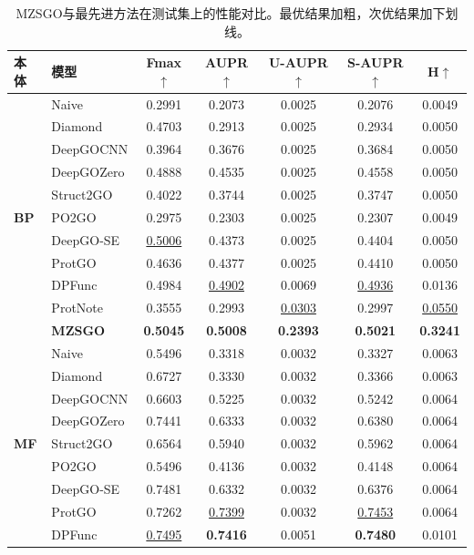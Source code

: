 \begin{table}[htbp]
\centering
\caption{MZSGO与最先进方法在测试集上的性能对比。最优结果加粗，次优结果加下划线。}
\label{tab:mzsgo_comparison}
\small
\begin{tabular}{llccccc}
\toprule
\textbf{本体} & \textbf{模型} & \textbf{Fmax}$\uparrow$ & \textbf{AUPR}$\uparrow$ & \textbf{U-AUPR}$\uparrow$ & \textbf{S-AUPR}$\uparrow$ & \textbf{H}$\uparrow$ \\
\midrule
\multirow{11}{*}{\textbf{BP}} 
 & Naive & 0.2991 & 0.2073 & 0.0025 & 0.2076 & 0.0049 \\
 & Diamond & 0.4703 & 0.2913 & 0.0025 & 0.2934 & 0.0050 \\
 & DeepGOCNN & 0.3964 & 0.3676 & 0.0025 & 0.3684 & 0.0050 \\
 & DeepGOZero & 0.4888 & 0.4535 & 0.0025 & 0.4558 & 0.0050 \\
 & Struct2GO & 0.4022 & 0.3744 & 0.0025 & 0.3747 & 0.0050 \\
 & PO2GO & 0.2975 & 0.2303 & 0.0025 & 0.2307 & 0.0049 \\
 & DeepGO-SE & \underline{0.5006} & 0.4373 & 0.0025 & 0.4404 & 0.0050 \\
 & ProtGO & 0.4636 & 0.4377 & 0.0025 & 0.4410 & 0.0050 \\
 & DPFunc & 0.4984 & \underline{0.4902} & 0.0069 & \underline{0.4936} & 0.0136 \\
 & ProtNote & 0.3555 & 0.2993 & \underline{0.0303} & 0.2997 & \underline{0.0550} \\
 & \textbf{MZSGO} & \textbf{0.5045} & \textbf{0.5008} & \textbf{0.2393} & \textbf{0.5021} & \textbf{0.3241} \\
\midrule
\multirow{11}{*}{\textbf{MF}} 
 & Naive & 0.5496 & 0.3318 & 0.0032 & 0.3327 & 0.0063 \\
 & Diamond & 0.6727 & 0.3330 & 0.0032 & 0.3366 & 0.0063 \\
 & DeepGOCNN & 0.6603 & 0.5225 & 0.0032 & 0.5242 & 0.0064 \\
 & DeepGOZero & 0.7441 & 0.6333 & 0.0032 & 0.6380 & 0.0064 \\
 & Struct2GO & 0.6564 & 0.5940 & 0.0032 & 0.5962 & 0.0064 \\
 & PO2GO & 0.5496 & 0.4136 & 0.0032 & 0.4148 & 0.0064 \\
 & DeepGO-SE & 0.7481 & 0.6332 & 0.0032 & 0.6376 & 0.0064 \\
 & ProtGO & 0.7262 & \underline{0.7399} & 0.0032 & \underline{0.7453} & 0.0064 \\
 & DPFunc & \underline{0.7495} & \textbf{0.7416} & 0.0051 & \textbf{0.7480} & 0.0101 \\

\end{tabular}
\end{table}
